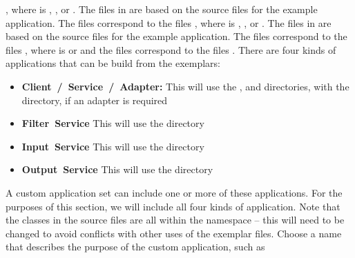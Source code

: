 , where  is ,
,  or .
The files in  are based on the source files for the
 example application.
The files  correspond to the files
, where  is ,
,  or .
The files in  are based on the source files for the
 example application.
The files  correspond to the files
, where  is  or
 and the files  correspond to the
files .
\secondaryEnd{}
There are four kinds of applications that can be build from the exemplars:
\begin{itemize}
\item \textbf{Client~/~Service~/~Adapter:} This will use the
,  and
 directories, with the 
directory, if an adapter is required
\item \textbf{Filter~Service} This will use the 
directory
\item \textbf{Input~Service} This will use the 
directory
\item \textbf{Output~Service} This will use the 
directory 
\end{itemize}
A custom application set can include one or more of these applications.
For the purposes of this section, we will include all four kinds of application.
\tertiaryEnd{}
Note that the classes in the source files are all within the 
namespace -- this will need to be changed to avoid conflicts with other uses of the
exemplar files.
Choose a name that describes the purpose of the custom application, such as
